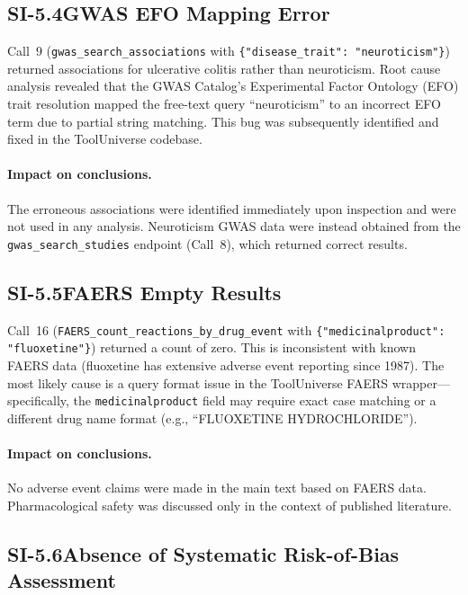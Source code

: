 \subsection*{SI-5.4\quad GWAS EFO Mapping Error}

Call~9 (\texttt{gwas\_search\_associations} with
\texttt{\{"disease\_trait": "neuroticism"\}}) returned associations for
ulcerative colitis rather than neuroticism.  Root cause analysis revealed
that the GWAS Catalog's Experimental Factor Ontology (EFO) trait resolution
mapped the free-text query ``neuroticism'' to an incorrect EFO term due to
partial string matching.  This bug was subsequently identified and fixed in
the ToolUniverse codebase.

\paragraph{Impact on conclusions.}
The erroneous associations were identified immediately upon inspection and
were not used in any analysis.  Neuroticism GWAS data were instead obtained
from the \texttt{gwas\_search\_studies} endpoint (Call~8), which returned
correct results.

\subsection*{SI-5.5\quad FAERS Empty Results}

Call~16 (\texttt{FAERS\_count\_reactions\_by\_drug\_event} with
\texttt{\{"medicinalproduct": "fluoxetine"\}}) returned a count of zero.
This is inconsistent with known FAERS data (fluoxetine has extensive adverse
event reporting since 1987).  The most likely cause is a query format
issue in the ToolUniverse FAERS wrapper---specifically, the
\texttt{medicinalproduct} field may require exact case matching or a
different drug name format (e.g., ``FLUOXETINE HYDROCHLORIDE'').

\paragraph{Impact on conclusions.}
No adverse event claims were made in the main text based on FAERS data.
Pharmacological safety was discussed only in the context of published
literature.

\subsection*{SI-5.6\quad Absence of Systematic Risk-of-Bias Assessment}

